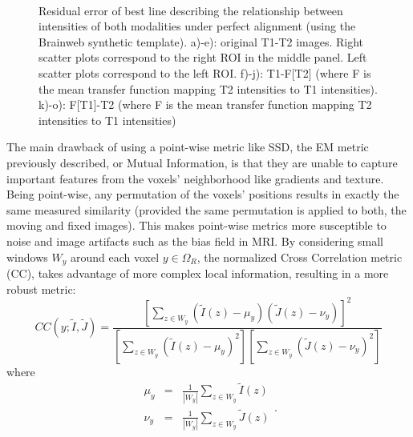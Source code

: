 \begin{figure}[t!]
    \\
    \caption{Residual error of best line describing the relationship between intensities of both modalities under perfect alignment (using the Brainweb synthetic template). a)-e): original T1-T2 images. Right scatter plots correspond to the right ROI in the middle panel. Left scatter plots correspond to the left ROI. f)-j): T1-F[T2] (where F is the mean transfer function mapping T2 intensities to T1 intensities). k)-o): F[T1]-T2 (where F is the mean transfer function mapping T2 intensities to T1 intensities) }
\label{fig:transfers}
\end{figure}



The main drawback of using a point-wise metric like SSD, the EM metric previously described, or Mutual Information, is that they are unable to capture important features from the voxels' neighborhood like gradients and texture. Being point-wise, any permutation of the voxels' positions results in exactly the same measured similarity (provided the same permutation is applied to both, the moving and fixed images). This makes point-wise metrics more susceptible to noise and image artifacts such as the bias field in MRI. By considering small windows $W_{y}$ around each voxel $y\in\Omega_{R}$, the normalized Cross Correlation metric (CC), takes advantage of more complex local information, resulting in a more robust metric:
\begin{equation}
    CC(y;\tilde{I}, \tilde{J}) = \frac{\left[\sum_{z\in W_{y}} \left(\tilde{I}(z) - \mu_{y}\right)\left(\tilde{J}(z) - \nu_{y}\right)\right]^{2}}
    {\left[\sum_{z \in W_{y}}\left(\tilde{I}(z) - \mu_{y}\right)^{2}\right] \left[\sum_{z \in W_{y}}\left(\tilde{J}(z) - \nu_{y}\right)^{2}\right]}
\end{equation}
where
\begin{equation}
    \begin{array}{lll}
        \mu_{y} &=& \frac{1}{|W_{y}|}\sum_{z \in W_{y}}\tilde{I}(z)\\
        \nu_{y} &=& \frac{1}{|W_{y}|}\sum_{z \in W_{y}}\tilde{J}(z)\\
    \end{array}.
\end{equation}

